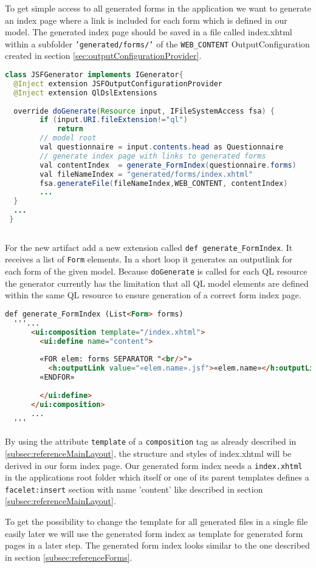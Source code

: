 To get simple access to all generated forms in the application
 we want to generate an index page where a link is included for each form which is defined
in our model.
The generated index page should be saved in a file called index.xhtml within a
subfolder \texttt{'generated/forms/'} of the \texttt{WEB\_CONTENT}
OutputConfiguration created in section \ref{sec:outputConfigurationProvider}.

\begin{lstlisting}[language=Java] 
class JSFGenerator implements IGenerator{
  @Inject extension JSFOutputConfigurationProvider
  @Inject extension QlDslExtensions
  
  override doGenerate(Resource input, IFileSystemAccess fsa) {
        if (input.URI.fileExtension!="ql")
            return
		// model root
        val questionnaire = input.contents.head as Questionnaire
		// generate index page with links to generated forms
        val contentIndex  = generate_FormIndex(questionnaire.forms)
        val fileNameIndex = "generated/forms/index.xhtml"
        fsa.generateFile(fileNameIndex,WEB_CONTENT, contentIndex)
        ...
  }
  ...
 }
      
\end{lstlisting}

For the new artifact add a new extension called \texttt{def
generate\_FormIndex}.
It receives a list of \texttt{Form} elements. In a short loop it generates an
outputlink for each form of the given model. Because \texttt{doGenerate} is
called for each QL resource the generator currently has the limitation that all
QL model elements are defined within the same QL resource to ensure generation of a
correct form index page.

\begin{lstlisting}[language=HTML] 
  def generate_FormIndex (List<Form> forms)
  '''...
      <ui:composition template="/index.xhtml">
        <ui:define name="content">
        
        «FOR elem: forms SEPARATOR "<br/>"»
          <h:outputLink value="«elem.name».jsf">«elem.name»</h:outputLink>
        «ENDFOR»
        
        </ui:define>
      </ui:composition>
      ... 
  '''
\end{lstlisting}

By using the attribute \texttt{template} of a \texttt{composition} tag as
already described in \ref{subsec:referenceMainLayout}, the structure and styles of
index.xhtml will be derived in our form index page. Our generated form index
needs a \texttt{index.xhtml} in the applications root folder which itself or one of its
parent templates defines a \texttt{facelet:insert} section with name 'content'
like described in section \ref{subsec:referenceMainLayout}.

To get the possibility to change the template for all generated files in
a single file easily later we will use the generated form index as template for
generated form pages in a later step. The generated form index looks similar to
the one described in section \ref{subsec:referenceForms}.
